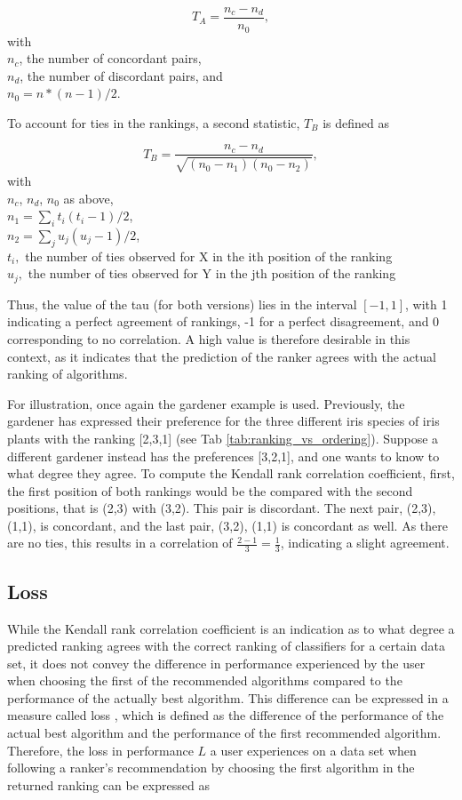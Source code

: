 $$T_A = \frac{n_c - n_d}{n_0},$$
with \\
$n_c$, the number of concordant pairs, \\
$n_d$, the number of discordant pairs, and \\
$n_0 = n * (n - 1) / 2$.

To account for ties in the rankings, a second statistic, $T_B$ \cite{Kendall2} is defined as

$$T_B = \frac{n_c - n_d}{\sqrt{(n_0 - n_1 )(n_0 - n_2 )}},$$
with \\
$n_c$, $n_d$, $n_0$ as above, \\
$n_1=\sum_i{t_i(t_i-1)/2}$, \\
$n_2=\sum_j{u_j(u_j-1)/2}$, \\
$t_i,$ the number of ties observed for X in the ith position of the ranking \\
$u_j,$ the number of ties observed for Y in the jth position of the ranking 

Thus, the value of the tau (for both versions) lies in the interval $[-1,1]$, with 1 indicating a perfect agreement of rankings, -1 for a perfect disagreement, and 0 corresponding to no correlation. A high value is therefore desirable in this context, as it indicates that the prediction of the ranker agrees with the actual ranking of algorithms.

For illustration, once again the gardener example is used. Previously, the gardener has expressed their preference for the three different iris species of iris plants with the ranking [2,3,1] (see Tab \ref{tab:ranking_vs_ordering}). Suppose a different gardener instead has the preferences [3,2,1], and one wants to know to what degree they agree. To compute the Kendall rank correlation coefficient, first, the first position of both rankings would be the compared with the second positions, that is (2,3) with (3,2). This pair is discordant. The next pair, (2,3), (1,1), is concordant, and the last pair, (3,2), (1,1) is concordant as well. As there are no ties, this results in a correlation of $\frac{2-1}{3}=\frac{1}{3}$, indicating a slight agreement. 

\subsection{Loss}
While the Kendall rank correlation coefficient is an indication as to what degree a predicted ranking agrees with the correct ranking of classifiers for a certain data set, it does not convey the difference in performance experienced by the user when choosing the first of the recommended algorithms compared to the performance of the actually best algorithm. This difference can be expressed in a measure called loss \cite{DBLP:conf/mldm/LeiteBV12}, which is defined as the difference of the performance of the actual best algorithm and the performance of the first recommended algorithm. Therefore, the loss in performance $L$ a user experiences on a data set when following a ranker's recommendation by choosing the first algorithm in the returned ranking can be expressed as 

